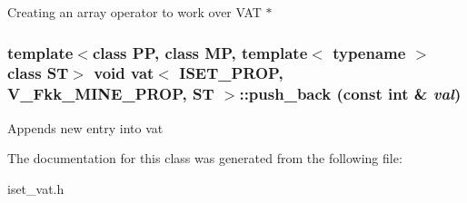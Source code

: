 Creating an array operator to work over VAT $\ast$ 
\subsubsection{\setlength{\rightskip}{0pt plus 5cm}template$<$class PP, class MP, template$<$ typename $>$ class ST$>$ void {\bf vat}$<$ ISET\_\-PROP, V\_\-Fkk\_\-MINE\_\-PROP, ST $>$::push\_\-back (const int \& {\em val})\hspace{0.3cm}{\tt  [inline]}}\label{classvat_3_01ISET__PROP_00_01V__Fkk__MINE__PROP_00_01ST_01_4_a8}


Appends new entry into vat 

The documentation for this class was generated from the following file:\begin{CompactItemize}
\item 
iset\_\-vat.h\end{CompactItemize}
